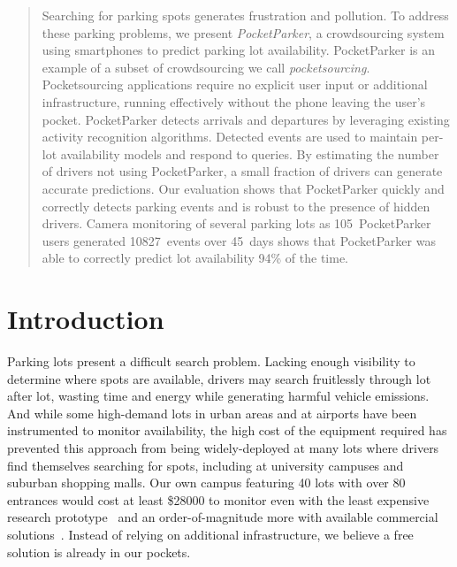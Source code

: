 \documentclass{sigchi}
\begin{document}
\begin{abstract}
Searching for parking spots generates frustration and pollution. To address
these parking problems, we present \textit{PocketParker}, a crowdsourcing
system using smartphones to predict parking lot availability. PocketParker is
an example of a subset of crowdsourcing we call \textit{pocketsourcing}.
Pocketsourcing applications require no explicit user input or additional
infrastructure, running effectively without the phone leaving the user's
pocket. PocketParker detects arrivals and departures by leveraging existing
activity recognition algorithms. Detected events are used to maintain per-lot
availability models and respond to queries. By estimating the number of
drivers not using PocketParker, a small fraction of drivers can generate
accurate predictions. Our evaluation shows that PocketParker quickly and
correctly detects parking events and is robust to the presence of hidden
drivers. Camera monitoring of several parking lots as 105~PocketParker users
generated \num{10827}~events over 45~days shows that PocketParker was able to
correctly predict lot availability 94\% of the time.

\end{abstract}




\section{Introduction}

Parking lots present a difficult search problem. Lacking enough visibility to
determine where spots are available, drivers may search fruitlessly through
lot after lot, wasting time and energy while generating harmful vehicle
emissions. And while some high-demand lots in urban areas and at airports
have been instrumented to monitor availability, the high cost of the
equipment required has prevented this approach from being widely-deployed at
many lots where drivers find themselves searching for spots, including at
university campuses and suburban shopping malls. Our own campus featuring 40
lots with over 80 entrances would cost at least \$\num{28000} to monitor even
with the least expensive research prototype~\cite{propst2012embedded} and an
order-of-magnitude more with available commercial
solutions~\cite{car-detect}. Instead of relying on additional infrastructure,
we believe a free solution is already in our pockets.
\end{document}
